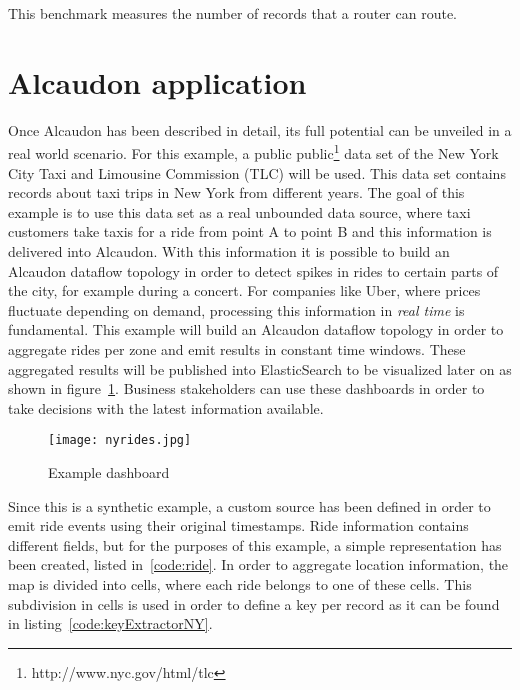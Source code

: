 This benchmark measures the number of records that a router can route.


\section{Alcaudon application}

Once Alcaudon has been described in detail, its full potential can be unveiled
in a real world scenario. For this example, a public
public\footnote{http://www.nyc.gov/html/tlc} data set of the New York City Taxi
and Limousine Commission (TLC) will be used. This data set contains records
about taxi trips in New York from different years. The goal of this example is
to use this data set as a real unbounded data source, where taxi customers take
taxis for a ride from point A to point B and this information is delivered into
Alcaudon. With this information it is possible to build an Alcaudon dataflow
topology in order to detect spikes in rides to certain parts of the city, for
example during a concert. For companies like Uber, where prices fluctuate
depending on demand, processing this information in \textit{real time} is
fundamental. This example will build an Alcaudon dataflow topology in order to
aggregate rides per zone and emit results in constant time windows. These
aggregated results will be published into ElasticSearch to be visualized later
on as shown in figure~\ref{fig:rides}. Business stakeholders can use these
dashboards in order to take decisions with the latest information available.

\begin{figure}[!h]
\begin{center}
\texttt{[image: nyrides.jpg]}
\caption{Example dashboard}
\label{fig:rides}
\end{center}
\end{figure}

Since this is a synthetic example, a custom source has been defined in order to
emit ride events using their original timestamps. Ride information contains
different fields, but for the purposes of this example, a simple representation
has been created, listed in~\ref{code:ride}. In order to aggregate location
information, the map is divided into cells, where each ride belongs to one of
these cells. This subdivision in cells is used in order to define a key per
record as it can be found in listing~\ref{code:keyExtractorNY}.

